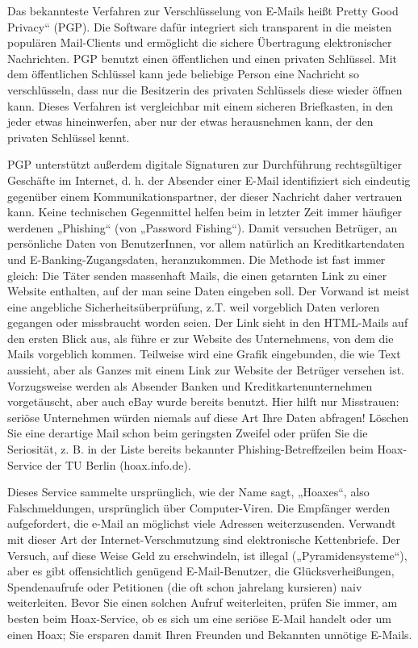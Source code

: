 \documentclass[]{book}
\theoremstyle{definition}
\theoremstyle{definition}
\theoremstyle{definition}
\theoremstyle{remark}
\begin{document}
Das bekannteste Verfahren zur Verschlüsselung von E-Mails heißt Pretty
Good Privacy`` (PGP). Die Software dafür integriert sich transparent in
die meisten populären Mail-Clients und ermöglicht die sichere
Übertragung elektronischer Nachrichten. PGP benutzt einen öffentlichen
und einen privaten Schlüssel. Mit dem öffentlichen Schlüssel kann jede
beliebige Person eine Nachricht so verschlüsseln, dass nur die
Besitzerin des privaten Schlüssels diese wieder öffnen kann. Dieses
Verfahren ist vergleichbar mit einem sicheren Briefkasten, in den jeder
etwas hineinwerfen, aber nur der etwas herausnehmen kann, der den
privaten Schlüssel kennt.

PGP unterstützt außerdem digitale Signaturen zur Durchführung
rechtsgültiger Geschäfte im Internet, d. h. der Absender einer E-Mail
identifiziert sich eindeutig gegenüber einem Kommunikationspartner, der
dieser Nachricht daher vertrauen kann. Keine technischen Gegenmittel
helfen beim in letzter Zeit immer häufiger werdenen „Phishing`` (von
„Password Fishing``). Damit versuchen Betrüger, an persönliche Daten von
BenutzerInnen, vor allem natürlich an Kreditkartendaten und
E-Banking-Zugangsdaten, heranzukommen. Die Methode ist fast immer
gleich: Die Täter senden massenhaft Mails, die einen getarnten Link zu
einer Website enthalten, auf der man seine Daten eingeben soll. Der
Vorwand ist meist eine angebliche Sicherheitsüberprüfung, z.T. weil
vorgeblich Daten verloren gegangen oder missbraucht worden seien. Der
Link sieht in den HTML-Mails auf den ersten Blick aus, als führe er zur
Website des Unternehmens, von dem die Mails vorgeblich kommen. Teilweise
wird eine Grafik eingebunden, die wie Text aussieht, aber als Ganzes mit
einem Link zur Website der Betrüger versehen ist. Vorzugsweise werden
als Absender Banken und Kreditkartenunternehmen vorgetäuscht, aber auch
eBay wurde bereits benutzt. Hier hilft nur Misstrauen: seriöse
Unternehmen würden niemals auf diese Art Ihre Daten abfragen! Löschen
Sie eine derartige Mail schon beim geringsten Zweifel oder prüfen Sie
die Seriosität, z. B. in der Liste bereits bekannter
Phishing-Betreffzeilen beim Hoax-Service der TU Berlin (hoax.info.de).

Dieses Service sammelte ursprünglich, wie der Name sagt, „Hoaxes``, also
Falschmeldungen, ursprünglich über Computer-Viren. Die Empfänger werden
aufgefordert, die e-Mail an möglichst viele Adressen weiterzusenden.
Verwandt mit dieser Art der Internet-Verschmutzung sind elektronische
Kettenbriefe. Der Versuch, auf diese Weise Geld zu erschwindeln, ist
illegal („Pyramidensysteme``), aber es gibt offensichtlich genügend
E-Mail-Benutzer, die Glücksverheißungen, Spendenaufrufe oder Petitionen
(die oft schon jahrelang kursieren) naiv weiterleiten. Bevor Sie einen
solchen Aufruf weiterleiten, prüfen Sie immer, am besten beim
Hoax-Service, ob es sich um eine seriöse E-Mail handelt oder um einen
Hoax; Sie ersparen damit Ihren Freunden und Bekannten unnötige E-Mails.
\end{document}
